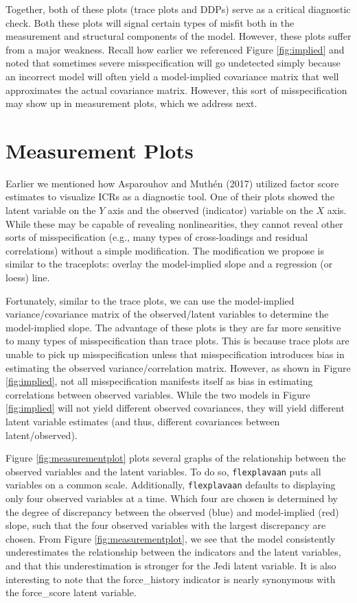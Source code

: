 \documentclass[
  english,
  doc]{apa6}
\begin{document}
Together, both of these plots (trace plots and DDPs) serve as a critical diagnostic check. Both these plots will signal certain types of misfit both in the measurement and structural components of the model. However, these plots suffer from a major weakness. Recall how earlier we referenced Figure \ref{fig:implied} and noted that sometimes severe misspecification will go undetected simply because an incorrect model will often yield a model-implied covariance matrix that well approximates the actual covariance matrix. However, this sort of misspecification may show up in measurement plots, which we address next.

\hypertarget{measurement-plots}{%
\section{Measurement Plots}\label{measurement-plots}}

Earlier we mentioned how Asparouhov and Muthén (2017) utilized factor score estimates to visualize ICRs as a diagnostic tool. One of their plots showed the latent variable on the \(Y\) axis and the observed (indicator) variable on the \(X\) axis. While these may be capable of revealing nonlinearities, they cannot reveal other sorts of misspecification (e.g., many types of cross-loadings and residual correlations) without a simple modification. The modification we propose is similar to the traceplots: overlay the model-implied slope and a regression (or loess) line.

Fortunately, similar to the trace plots, we can use the model-implied variance/covariance matrix of the observed/latent variables to determine the model-implied slope. The advantage of these plots is they are far more sensitive to many types of misspecification than trace plots. This is because trace plots are unable to pick up misspecification unless that misspecification introduces bias in estimating the observed variance/correlation matrix. However, as shown in Figure \ref{fig:implied}, not all misspecification manifests itself as bias in estimating correlations between observed variables. While the two models in Figure \ref{fig:implied} will not yield different observed covariances, they will yield different latent variable estimates (and thus, different covariances between latent/observed).

Figure \ref{fig:measurementplot} plots several graphs of the relationship between the observed variables and the latent variables. To do so, \texttt{flexplavaan} puts all variables on a common scale. Additionally, \texttt{flexplavaan} defaults to displaying only four observed variables at a time. Which four are chosen is determined by the degree of discrepancy between the observed (blue) and model-implied (red) slope, such that the four observed variables with the largest discrepancy are chosen. From Figure \ref{fig:measurementplot}, we see that the model consistently underestimates the relationship between the indicators and the latent variables, and that this underestimation is stronger for the Jedi latent variable. It is also interesting to note that the force\_history indicator is nearly synonymous with the force\_score latent variable.
\end{document}
